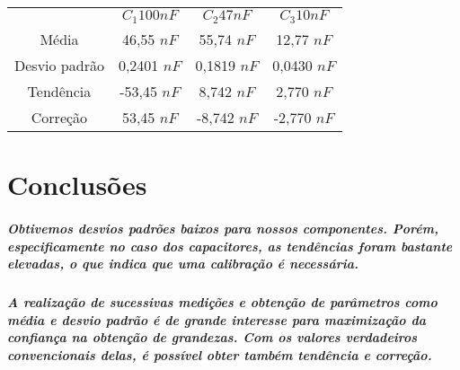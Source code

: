 \documentclass[12pt,twoside, a4paper, twocolumn]{article}
\begin{document}
\begin{center}
    \begin{tabular}{ |c|c|c|c| }
        \hline
                      & $C_1 100 nF$ & $C_2 47 nF$ & $C_3 10 nF$ \\
        Média         & 46,55 $nF$        & 55,74 $nF$       & 12,77 $nF$       \\
        Desvio padrão & 0,2401 $nF$       & 0,1819 $nF$      & 0,0430 $nF$      \\
        Tendência     & -53,45 $nF$       & 8,742 $nF$       & 2,770 $nF$       \\
        Correção      & 53,45 $nF$        & -8,742 $nF$      & -2,770 $nF$      \\
        \hline
    \end{tabular}
\end{center}

\section{Conclusões}

\subparagraph*{Obtivemos desvios padrões baixos para nossos componentes. Porém, especificamente no caso dos capacitores, as tendências foram bastante elevadas, o que indica que uma calibração é necessária.}

\subparagraph*{A realização de sucessivas medições e obtenção de parâmetros como média e desvio padrão é de grande interesse para maximização da confiança na obtenção de grandezas. Com os valores verdadeiros convencionais delas, é possível obter também tendência e correção.}
\end{document}
